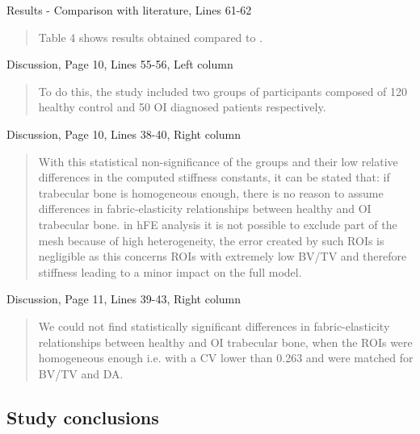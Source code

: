 \documentclass{AR2RC}
\begin{document}
Results - Comparison with literature, Lines 61-62
\begin{quote}
	Table 4 shows results obtained  compared to  .
\end{quote}

Discussion, Page 10, Lines 55-56, Left column
\begin{quote}
	To do this, the study included two groups of participants composed of 120 healthy control and 50 OI diagnosed patients respectively. 
\end{quote}

\newpage
Discussion, Page 10, Lines 38-40, Right column
\begin{quote}
	With this statistical non-significance of the groups and their low relative differences in the computed stiffness constants, it can be stated that: if trabecular bone is homogeneous enough, there is no reason to assume differences in fabric-elasticity relationships between healthy and OI trabecular bone.  in hFE analysis  it is not possible to exclude part of the mesh because of high heterogeneity, the error created by such ROIs is negligible as this  concerns ROIs with extremely low BV/TV and therefore stiffness leading to a minor impact on the full model.
\end{quote}

Discussion, Page 11, Lines 39-43, Right column
\begin{quote}
	We could not find statistically significant differences in fabric-elasticity relationships between healthy and OI trabecular bone, when the ROIs were homogeneous enough i.e. with a CV lower than 0.263 and were matched for BV/TV and DA.
\end{quote}

\subsection{Study conclusions}
\end{document}
